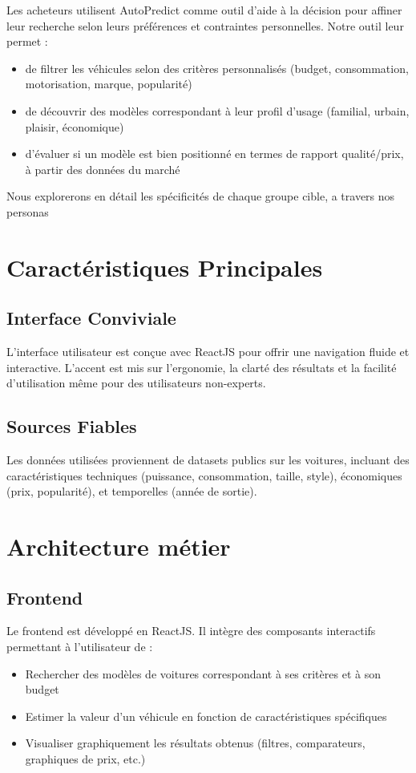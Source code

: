 \documentclass[12pt]{report}
\begin{document}
Les acheteurs utilisent AutoPredict comme outil d’aide à la décision pour affiner leur recherche selon leurs préférences et contraintes personnelles. Notre outil leur permet :
\begin{itemize}
    \item de filtrer les véhicules selon des critères personnalisés (budget, consommation, motorisation, marque, popularité) 
    \item de découvrir des modèles correspondant à leur profil d’usage (familial, urbain, plaisir, économique) 
    \item d’évaluer si un modèle est bien positionné en termes de rapport qualité/prix, à partir des données du marché
\end{itemize}
Nous explorerons en détail les spécificités de chaque groupe cible, a travers nos personas

\chapter{Caractéristiques Principales}
\section{Interface Conviviale}
L’interface utilisateur est conçue avec ReactJS pour offrir une navigation fluide et interactive.
L’accent est mis sur l’ergonomie, la clarté des résultats et la facilité d’utilisation même pour des utilisateurs non-experts.


\section{Sources Fiables}
Les données utilisées proviennent de datasets publics sur les voitures, incluant des caractéristiques techniques (puissance, consommation, taille, style), économiques (prix, popularité), et temporelles (année de sortie).

\chapter{Architecture métier}
\section{Frontend}
Le frontend est développé en ReactJS. Il intègre des composants interactifs permettant à l’utilisateur de :

\begin{itemize}
    \item Rechercher des modèles de voitures correspondant à ses critères et à son budget
    \item Estimer la valeur d’un véhicule en fonction de caractéristiques spécifiques
    \item Visualiser graphiquement les résultats obtenus (filtres, comparateurs, graphiques de prix, etc.)
\end{itemize}
\end{document}

